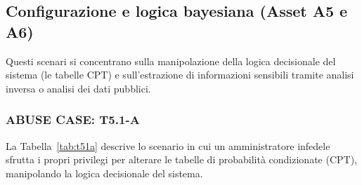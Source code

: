 \subsection{Configurazione e logica bayesiana (Asset A5 e A6)}
Questi scenari si concentrano sulla manipolazione della logica decisionale del sistema (le tabelle CPT) e sull'estrazione di informazioni sensibili tramite analisi inversa o analisi dei dati pubblici.

\subsubsection*{ABUSE CASE: T5.1-A}
La Tabella~\ref{tab:t51a} descrive lo scenario in cui un amministratore infedele sfrutta i propri privilegi per alterare le tabelle di probabilit\`a condizionate (CPT), manipolando la logica decisionale del sistema.

